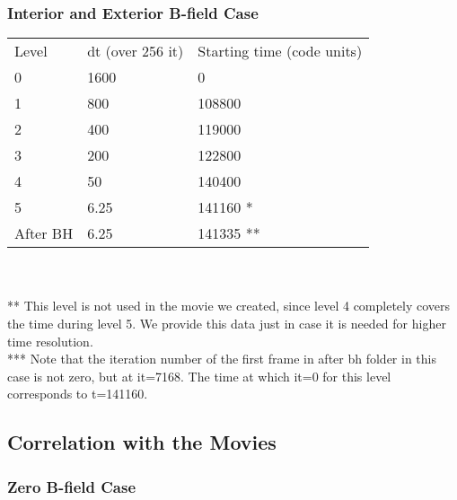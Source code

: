 \documentclass{article}
\begin{document}
\subsubsection{Interior and Exterior B-field Case}
\begin{tabular}{l l l}
Level		& dt (over 256 it)	& Starting time (code units) \\
0		& 1600			& 0 		\\
1		& 800			& 108800	\\
2		& 400			& 119000	\\
3		& 200			& 122800	\\
4		& 50			& 140400	\\
5		& 6.25			& 141160 *	\\
After BH	& 6.25			& 141335 **	\\
\end{tabular}
\\
\\
** This level is not used in the movie we created, since level 4 completely covers the time during level 5. We provide this data just in case it is needed for higher time resolution. \\
*** Note that the iteration number of the first frame in after bh folder in this case is not zero, but at it=7168. The time at which it=0 for this level corresponds to t=141160.

\subsection{Correlation with the Movies}
\subsubsection{Zero B-field Case}
\end{document}
